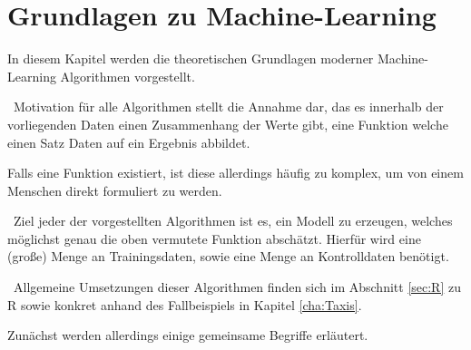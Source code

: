 \chapter{Grundlagen zu Machine-Learning}
\label{cha:MachineLearning}
\label{cha:Theorie}
In diesem Kapitel werden die theoretischen Grundlagen moderner Machine-Learning Algorithmen vorgestellt. 

~\newline Motivation für alle Algorithmen stellt die Annahme dar, das es innerhalb der vorliegenden Daten einen Zusammenhang der Werte gibt, eine Funktion welche einen Satz Daten auf ein Ergebnis abbildet. 

Falls eine Funktion existiert, ist diese allerdings häufig zu komplex, um von einem Menschen direkt formuliert zu werden.   

~\newline Ziel jeder der vorgestellten Algorithmen ist es, ein Modell zu erzeugen, welches möglichst genau die oben vermutete Funktion abschätzt. Hierfür wird eine (große) Menge an Trainingsdaten, sowie eine Menge an Kontrolldaten benötigt.   

~\newline Allgemeine Umsetzungen dieser Algorithmen finden sich im Abschnitt \ref{sec:R} zu R sowie konkret anhand des Fallbeispiels in Kapitel \ref{cha:Taxis}. 

Zunächst werden allerdings einige gemeinsame Begriffe erläutert. 



